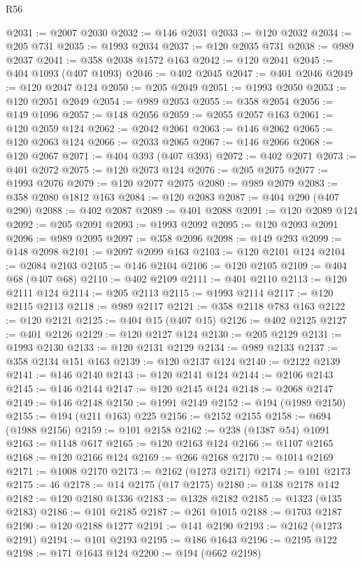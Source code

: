 \begin{lexlean}{R56}
\begin{coremodule}
@2031 := @2007 @2030
@2032 := @146 @2031
@2033 := @120 @2032
@2034 := @205 @731
@2035 := @1993 @2034
@2037 := @120 @2035 @731
@2038 := @989 @2037
@2041 := @358 @2038 @1572 @163
@2042 := @120 @2041
@2045 := @404 @1093 (@407 @1093)
@2046 := @402 @2045
@2047 := @401 @2046
@2049 := @120 @2047 @124
@2050 := @205 @2049
@2051 := @1993 @2050
@2053 := @120 @2051 @2049
@2054 := @989 @2053
@2055 := @358 @2054
@2056 := @149 @1096
@2057 := @148 @2056
@2059 := @2055 @2057 @163
@2061 := @120 @2059 @124
@2062 := @2042 @2061
@2063 := @146 @2062
@2065 := @120 @2063 @124
@2066 := @2033 @2065
@2067 := @146 @2066
@2068 := @120 @2067
@2071 := @404 @393 (@407 @393)
@2072 := @402 @2071
@2073 := @401 @2072
@2075 := @120 @2073 @124
@2076 := @205 @2075
@2077 := @1993 @2076
@2079 := @120 @2077 @2075
@2080 := @989 @2079
@2083 := @358 @2080 @1812 @163
@2084 := @120 @2083
@2087 := @404 @290 (@407 @290)
@2088 := @402 @2087
@2089 := @401 @2088
@2091 := @120 @2089 @124
@2092 := @205 @2091
@2093 := @1993 @2092
@2095 := @120 @2093 @2091
@2096 := @989 @2095
@2097 := @358 @2096
@2098 := @149 @293
@2099 := @148 @2098
@2101 := @2097 @2099 @163
@2103 := @120 @2101 @124
@2104 := @2084 @2103
@2105 := @146 @2104
@2106 := @120 @2105
@2109 := @404 @68 (@407 @68)
@2110 := @402 @2109
@2111 := @401 @2110
@2113 := @120 @2111 @124
@2114 := @205 @2113
@2115 := @1993 @2114
@2117 := @120 @2115 @2113
@2118 := @989 @2117
@2121 := @358 @2118 @783 @163
@2122 := @120 @2121
@2125 := @404 @15 (@407 @15)
@2126 := @402 @2125
@2127 := @401 @2126
@2129 := @120 @2127 @124
@2130 := @205 @2129
@2131 := @1993 @2130
@2133 := @120 @2131 @2129
@2134 := @989 @2133
@2137 := @358 @2134 @151 @163
@2139 := @120 @2137 @124
@2140 := @2122 @2139
@2141 := @146 @2140
@2143 := @120 @2141 @124
@2144 := @2106 @2143
@2145 := @146 @2144
@2147 := @120 @2145 @124
@2148 := @2068 @2147
@2149 := @146 @2148
@2150 := @1991 @2149
@2152 := @194 (@1989 @2150)
@2155 := @194 (@211 @163) @225
@2156 := @2152 @2155
@2158 := @694 (@1988 @2156)
@2159 := @101 @2158
@2162 := @238 (@1387 @54) @1091
@2163 := @1148 @617
@2165 := @120 @2163 @124
@2166 := @1107 @2165
@2168 := @120 @2166 @124
@2169 := @266 @2168
@2170 := @1014 @2169
@2171 := @1008 @2170
@2173 := @2162 (@1273 @2171)
@2174 := @101 @2173
@2175 := 46
@2178 := @14 @2175 (@17 @2175)
@2180 := @138 @2178 @142
@2182 := @120 @2180 @1336
@2183 := @1328 @2182
@2185 := @1323 (@135 @2183)
@2186 := @101 @2185
@2187 := @261 @1015
@2188 := @1703 @2187
@2190 := @120 @2188 @1277
@2191 := @141 @2190
@2193 := @2162 (@1273 @2191)
@2194 := @101 @2193
@2195 := @186 @1643
@2196 := @2195 @122
@2198 := @171 @1643 @124
@2200 := @194 (@662 @2198)

\end{coremodule}
\end{lexlean}
